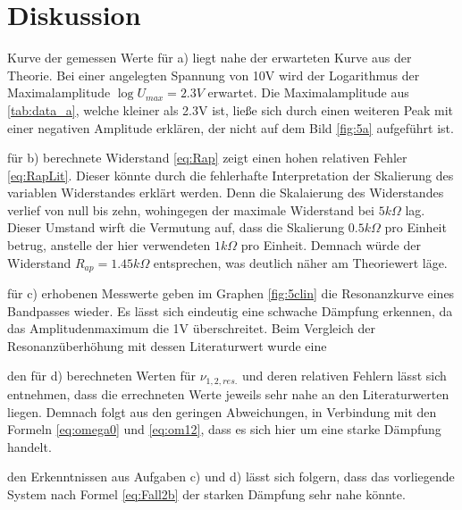 \section{Diskussion}\justifying

\justifying Kurve der gemessen Werte für a) liegt nahe der erwarteten Kurve aus der Theorie. Bei einer angelegten 
Spannung von 10V wird der Logarithmus der Maximalamplitude $\log{U_{max}} = 2.3V$ erwartet. Die Maximalamplitude aus \ref{tab:data_a}, 
welche kleiner als 2.3V ist, ließe sich durch einen weiteren Peak mit einer negativen Amplitude erklären, der nicht auf dem Bild 
\ref{fig:5a} aufgeführt ist. 

\justifying für b) berechnete Widerstand \eqref{eq:Rap} zeigt einen hohen relativen Fehler \eqref{eq:RapLit}. 
Dieser könnte durch die fehlerhafte Interpretation der Skalierung des variablen Widerstandes erklärt werden. Denn die Skalaierung 
des Widerstandes verlief von null bis zehn, wohingegen der maximale Widerstand bei $5k\Omega$ lag. Dieser Umstand wirft die 
Vermutung auf, dass die Skalierung $0.5k\Omega$ pro Einheit betrug, anstelle der hier verwendeten $1k\Omega$ pro Einheit. Demnach 
würde der Widerstand $R_{ap} = 1.45k\Omega$ entsprechen, was deutlich näher am Theoriewert läge.

\justifying für c) erhobenen Messwerte geben im Graphen \ref{fig:5clin} die Resonanzkurve eines Bandpasses wieder. 
Es lässt sich eindeutig eine schwache Dämpfung erkennen, da das Amplitudenmaximum die 1V überschreitet. Beim Vergleich der 
Resonanzüberhöhung mit dessen Literaturwert wurde eine

\justifying den für d) berechneten Werten für $\nu_{1,2,res.}$ und deren relativen Fehlern lässt sich entnehmen,
dass die errechneten Werte jeweils sehr nahe an den Literaturwerten liegen. Demnach folgt aus den geringen Abweichungen, in 
Verbindung mit den Formeln \eqref{eq:omega0} und \eqref{eq:om12}, dass es sich hier um eine starke Dämpfung handelt.

\justifying den Erkenntnissen aus Aufgaben c) und d) lässt sich folgern, dass das vorliegende System nach Formel 
\eqref{eq:Fall2b} der starken Dämpfung sehr nahe könnte.  

\newpage

\printbibliography





